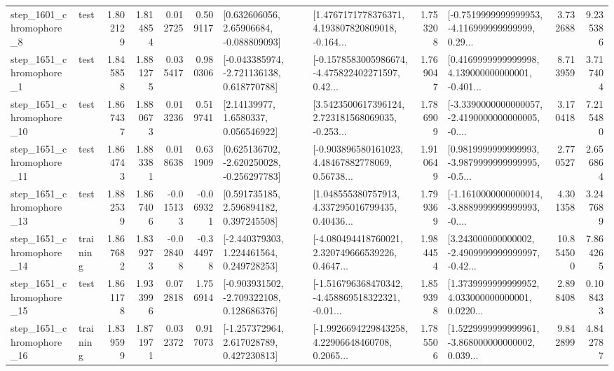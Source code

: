 \begin{tabular}{llrrrrllrlrr}
  step\_1601\_chromophore\_8 &      test &      1.802129 &    1.814854 &      0.012725 &  0.509117 &     [0.632606056, 2.65906684, -0.088809093] &  [1.4767171778376371, 4.193807820809018, -0.164... &       1.753208 &  [-0.7519999999999953, -4.116999999999999, 0.29... &            3.732688 &          9.235386 \\
  step\_1651\_chromophore\_1 &      test &      1.845858 &    1.881275 &      0.035417 &  0.980306 &   [-0.043385974, -2.721136138, 0.618770788] &  [-0.1578583005986674, -4.475822402271597, 0.42... &       1.769047 &  [0.4169999999999998, 4.139000000000001, -0.401... &            8.713959 &          3.717404 \\
 step\_1651\_chromophore\_10 &      test &      1.867437 &    1.880673 &      0.013236 &  0.519741 &        [2.14139977, 1.6580337, 0.056546922] &  [3.5423500617396124, 2.723181568069035, -0.253... &       1.786909 &  [-3.3390000000000057, -2.4190000000000005, -0.... &            3.170418 &          7.215480 \\
 step\_1651\_chromophore\_11 &      test &      1.864743 &    1.883381 &      0.018638 &  0.631909 &   [0.625136702, -2.620250028, -0.256297783] &  [-0.903896580161023, 4.48467882778069, 0.56738... &       1.910649 &  [0.9819999999999993, -3.9879999999999995, -0.5... &            2.770527 &          2.656864 \\
 step\_1651\_chromophore\_13 &      test &      1.882539 &    1.867406 &     -0.015133 & -0.069321 &     [0.591735185, 2.596894182, 0.397245508] &  [1.048555380757913, 4.337295016799435, 0.40436... &       1.799369 &  [-1.1610000000000014, -3.8889999999999993, -0.... &            4.301358 &          3.247689 \\
 step\_1651\_chromophore\_14 &  training &      1.867682 &    1.839273 &     -0.028408 & -0.344978 &    [-2.440379303, 1.224461564, 0.249728253] &  [-4.080494418760021, 2.320749666539226, 0.4647... &       1.984454 &  [3.243000000000002, -2.4909999999999997, -0.42... &           10.854500 &          7.864265 \\
 step\_1651\_chromophore\_15 &      test &      1.861178 &    1.933996 &      0.072818 &  1.756914 &   [-0.903931502, -2.709322108, 0.128686376] &  [-1.516796368470342, -4.458869518322321, -0.01... &       1.859398 &  [1.3739999999999952, 4.033000000000001, 0.0220... &            2.898408 &          0.108433 \\
 step\_1651\_chromophore\_16 &  training &      1.839599 &    1.871971 &      0.032372 &  0.917073 &    [-1.257372964, 2.617028789, 0.427230813] &  [-1.9926694229843258, 4.22906648460708, 0.2065... &       1.785506 &  [1.5229999999999961, -3.868000000000002, 0.039... &            9.842899 &          4.842787 \\

\end{tabular}
